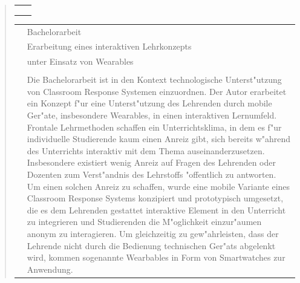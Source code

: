 \begin{quote}
\begin{tabular}{p{4cm}l}
\begin{minipage}{10cm}
		\end{minipage}\\\\\\
	\end{tabular}
%
	\begin{tabular}{p{4cm}l}
		&Bachelorarbeit\\
		&\qquad Erarbeitung eines interaktiven Lehrkonzepts\\
		&\qquad  unter Einsatz von Wearables\\\\
		&\begin{minipage}{10cm}
		Die Bachelorarbeit ist in den Kontext technologische Unterst"utzung von Classroom Response Systemen einzuordnen. Der Autor erarbeitet ein Konzept f"ur eine Unterst"utzung des Lehrenden durch mobile Ger"ate, insbesondere Wearables, in einen interaktiven Lernumfeld. Frontale Lehrmethoden schaffen ein Unterrichtsklima, in dem es f"ur individuelle Studierende kaum einen Anreiz gibt, sich bereits w"ahrend des Unterrichts interaktiv mit dem Thema auseinanderzusetzen. Insbesondere existiert wenig Anreiz auf Fragen des Lehrenden oder Dozenten zum Verst"andnis des Lehrstoffs "offentlich zu antworten. Um einen solchen Anreiz zu schaffen, wurde eine mobile Variante eines Classroom Response Systems konzipiert und prototypisch umgesetzt, die es dem Lehrenden gestattet interaktive Element in den Unterricht zu integrieren und Studierenden die M"oglichkeit einzur"aumen anonym zu interagieren. Um gleichzeitig zu gew"ahrleisten, dass der Lehrende nicht durch die Bedienung technischen Ger"ats abgelenkt wird, kommen sogenannte Wearbables in Form von Smartwatches zur Anwendung. 
		

\end{minipage}
\end{tabular}
\end{quote}
